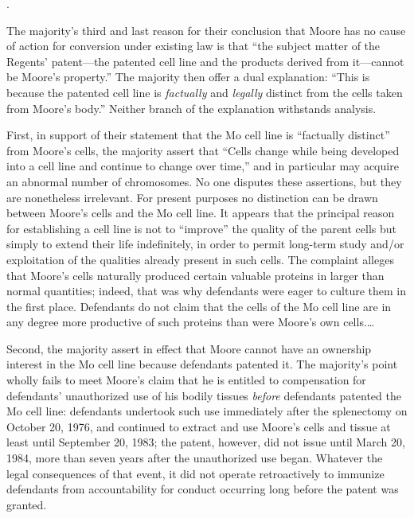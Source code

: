 {.
\par}

The majority's third and last reason for their conclusion that Moore has no
cause of action for conversion under existing law is that ``the subject matter
of the Regents' patent---the patented cell line and the products derived from
it---cannot be Moore's property.'' The majority then offer a dual explanation:
``This is because the patented cell line is \textit{factually} and
\textit{legally} distinct from the cells taken from Moore's body.'' Neither
branch of the explanation withstands analysis.

First, in support of their statement that the Mo cell line is ``factually
distinct'' from Moore's cells, the majority assert that ``Cells change while
being developed into a cell line and continue to change over time,'' and in
particular may acquire an abnormal number of chromosomes. No one disputes these
assertions, but they are nonetheless irrelevant. For present purposes no
distinction can be drawn between Moore's cells and the Mo cell line. It appears
that the principal reason for establishing a cell line is not to ``improve''
the quality of the parent cells but simply to extend their life indefinitely,
in order to permit long-term study and/or exploitation of the qualities already
present in such cells. The complaint alleges that Moore's cells naturally
produced certain valuable proteins in larger than normal quantities; indeed,
that was why defendants were eager to culture them in the first place.
Defendants do not claim that the cells of the Mo cell line are in any degree
more productive of such proteins than were Moore's own cells.{\dots}

Second, the majority assert in effect that Moore cannot have an ownership
interest in the Mo cell line because defendants patented it. The majority's
point wholly fails to meet Moore's claim that he is entitled to compensation
for defendants' unauthorized use of his bodily tissues \textit{before}
defendants patented the Mo cell line: defendants undertook such use immediately
after the splenectomy on October 20, 1976, and continued to extract and use
Moore's cells and tissue at least until September 20, 1983; the patent,
however, did not issue until March 20, 1984, more than seven years after the
unauthorized use began. Whatever the legal consequences of that event, it did
not operate retroactively to immunize defendants from accountability for
conduct occurring long before the patent was granted.

